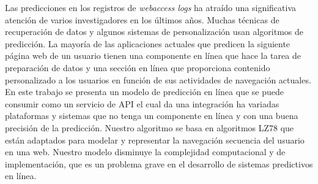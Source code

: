 {Las predicciones en los registros de \emph{webaccess logs} ha atraído una significativa atención de varios investigadores en los últimos años. Muchas técnicas de recuperación de datos y algunos sistemas de personalización usan algoritmos de predicción. La mayoría de las aplicaciones actuales que predicen la siguiente página web de un usuario tienen una componente en línea que hace la tarea de preparación de datos y una sección en línea que proporciona contenido personalizado a los usuarios en función de sus actividades de navegación actuales. En este trabajo se presenta un modelo de predicción en línea que se puede consumir como un servicio de API el cual da una integración ha variadas plataformas y sistemas que no tenga un componente en línea y con una buena precisión de la predicción. Nuestro algoritmo se basa en algoritmos LZ78 que están adaptados para modelar y representar la navegación secuencia del usuario en una web. Nuestro modelo disminuye la complejidad computacional y de implementación, que es un problema grave en el desarrollo de sistemas predictivos en línea.


  }
